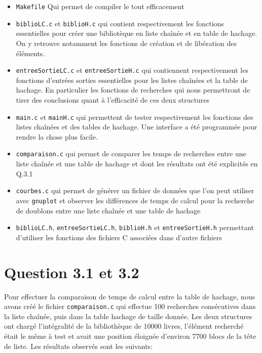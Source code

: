 \documentclass{article}
\begin{document}
    \begin{itemize}
        \item \texttt{Makefile} Qui permet de compiler le tout efficacement
        \item \texttt{biblioLC.c} et \texttt{biblioH.c} qui contient respectivement
        les fonctions essentielles pour créer une bibliotèque en liste chaînée et
        en table de hachage. On y retrouve notamment les fonctions de création et
        de libération des éléments.
        \item \texttt{entreeSortieLC.c} et \texttt{entreeSortieH.c} qui contiennent
        respectivement les fonctions d'entrées sorties essentielles pour les listes chaînées
        et la table de hachage. En particulier les fonctions de recherches qui nous
        permettront de tirer des conclusions quant à l'efficacité de ces deux structures
        \item \texttt{main.c} et \texttt{mainH.c} qui permettent de tester respectivement
        les fonctions des listes chaînées et des tables de hachage. Une interface a été
        programmée pour rendre la chose plus facile.
        \item \texttt{comparaison.c} qui permet de comparer les temps de recherches entre
        une liste chaînée et une table de hachage et dont les résultats ont été explicités
        en Q.3.1
        \item \texttt{courbes.c} qui permet de générer un fichier de données 
        que l'on peut utiliser avec \texttt{gnuplot} et observer les différences
        de temps de calcul pour la recherche de doublons entre une liste chaînée et
        une table de hachage
        \item \texttt{biblioLC.h}, \texttt{entreeSortieLC.h}, \texttt{biblioH.h} et \texttt{entreeSortieH.h}
        permettant d'utiliser les fonctions des fichiers C associées dans d'autre fichiers
    \end{itemize}
    

    \newpage
    \section{Question 3.1 et 3.2}

    Pour effectuer la comparaison de temps de calcul entre la table de hachage, nous avons créé
    le fichier \texttt{comparaison.c} qui effectue 100 recherches consécutives 
    dans la liste chaînée, puis dans la table hachage de taille donnée. 
    \newline
    Les deux structures ont chargé l'intégralité de la bibliothèque de 10000 livres,
    l'élément recherché était le même à test et avait une position éloignée
    d'environ 7700 blocs de la tête de liste.
    \newline
    Les résultats observés sont les suivants:
\end{document}
